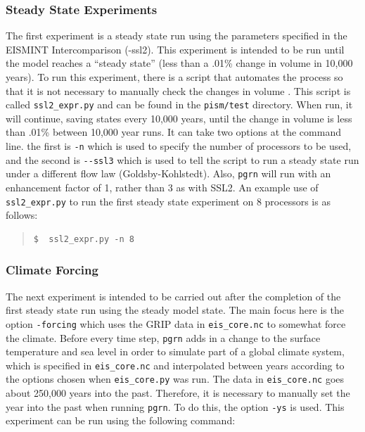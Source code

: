 \documentclass[11pt,final]{amsart}
\begin{document}
\subsubsection{Steady State Experiments}  The first experiment is a steady state run using the parameters specified in the EISMINT Intercomparison (-ssl2). This experiment is intended to be run until the model reaches a ``steady state'' (less than a .01\% change in volume in 10,000 years). To run this experiment, there is a script that automates the process so that it is not necessary to manually check the changes in volume . This script is called \verb|ssl2_expr.py| and can be found in the \verb|pism/test| directory. When run, it will continue, saving states every 10,000 years, until the change in volume is less than .01\% between 10,000 year runs. It can take two options at the command line. the first is \verb|-n| which is used to specify the number of processors to be used, and the second is \verb|--ssl3| which is used to tell the script to run a steady state run under a different flow law (Goldsby-Kohlstedt). Also, \verb|pgrn| will run with an enhancement factor of 1, rather than 3 as with SSL2.  An example use of \verb|ssl2_expr.py| to run the first steady state experiment on 8 processors is as follows:

\small\begin{quote}\begin{verbatim}
$  ssl2_expr.py -n 8
\end{verbatim}
\end{quote}\normalsize

\subsubsection{Climate Forcing}  The next experiment is intended to be carried out after the completion of the first steady state run using the steady model state. The main focus here is the option \verb|-forcing| which uses the GRIP data in \verb|eis_core.nc| to somewhat force the climate. Before every time step, \verb|pgrn| adds in a change to the surface temperature and sea level in order to simulate part of a global climate system, which is specified in \verb|eis_core.nc| and interpolated between years according to the options chosen when \verb|eis_core.py| was run. The data in \verb|eis_core.nc| goes about 250,000 years into the past. Therefore, it is necessary to manually set the year into the past when running \verb|pgrn|. To do this, the option \verb|-ys| is used. This experiment can be run using the following command:
\end{document}
